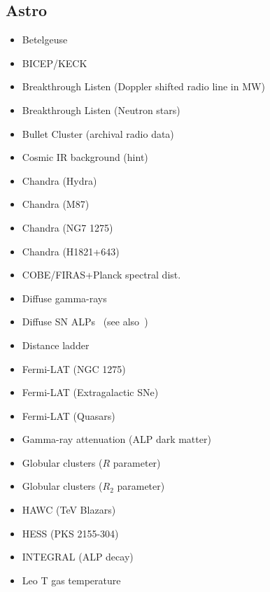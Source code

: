 \documentclass[9pt,twocolumn]{extarticle}
\begin{document}
\begin{mdframed}[everyline=true]
\subsection*{Astro}\vspace{-0.5em}
\begin{itemize}\setlength\itemsep{-0.5em}
	\item Betelgeuse~\cite{Xiao:2020pra}
	\item BICEP/KECK~\cite{BICEPKeck:2021sbt}
	\item Breakthrough Listen (Doppler shifted radio line in MW)~\cite{Keller:2021zbl}
	\item Breakthrough Listen (Neutron stars)~\cite{Foster:2022fxn}
    \item Bullet Cluster (archival radio data)~\cite{Chan:2021gjl}
  	\item Cosmic IR background (hint)~\cite{Kohri:2017ljt}
    \item Chandra (Hydra)~\cite{Wouters:2013hua}
    \item Chandra (M87)~\cite{Marsh:2017yvc}
    \item Chandra (NG7 1275)~\cite{Reynolds:2019uqt}
    \item Chandra (H1821+643)~\cite{Reynes:2021bpe}
    \item COBE/FIRAS+Planck spectral dist.~\cite{Bolliet:2020ofj}
    \item Diffuse gamma-rays~\cite{Caputo:2022mah}
    \item Diffuse SN ALPs~\cite{Calore:2021hhn} (see also~\cite{Calore:2020tjw})
    \item Distance ladder~\cite{Buen-Abad:2020zbd}
    \item Fermi-LAT (NGC 1275)~\cite{Fermi-LAT:2016nkz}
    \item Fermi-LAT (Extragalactic SNe)~\cite{Meyer:2020vzy}
   	\item Fermi-LAT (Quasars)~\cite{Davies:2022wvj}
   	\item Gamma-ray attenuation (ALP dark matter)~\cite{Bernal:2022xyi}
    \item Globular clusters ($R$ parameter)~\cite{Ayala:2014pea}
    \item Globular clusters ($R_2$ parameter)~\cite{Dolan:2022kul}
    \item HAWC (TeV Blazars)~\cite{Jacobsen:2022swa}
    \item HESS (PKS 2155-304)~\cite{HESS:2013udx}
    \item INTEGRAL (ALP decay)~\cite{Calore:2022pks}
    \item Leo T gas temperature~\cite{Wadekar:2021qae}

\end{itemize}
\end{mdframed}
\end{document}
